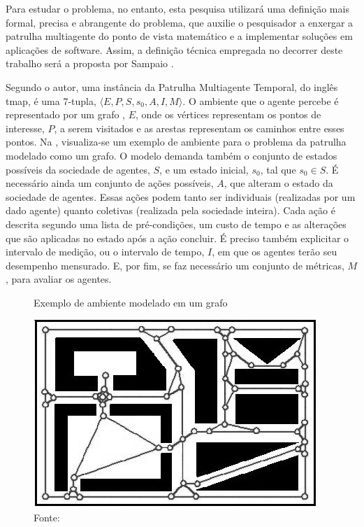 Para estudar o problema, no entanto, esta pesquisa utilizará uma definição mais 
formal, precisa e abrangente do problema, que auxilie o pesquisador a enxergar 
a patrulha multiagente do ponto de vista matemático e a implementar soluções em 
aplicações de software. Assim, a definição técnica empregada no decorrer deste 
trabalho será a proposta por Sampaio \citep{sampaiophd}.

Segundo o autor, uma instância da Patrulha Multiagente Temporal, do inglês 
\ac{tmap}, é uma 7-tupla, $ \langle E, P, S, s_{0}, A, I, M \rangle $. O 
ambiente que o agente percebe é representado por um grafo 
\citep{Rosen:2002:DMA:579402}, $E$, onde os vértices representam os pontos de 
interesse, $P$, a serem visitados e as arestas representam os caminhos entre 
esses pontos. Na , visualiza-se um exemplo de ambiente 
para o problema da patrulha modelado como um grafo. O modelo demanda também o 
conjunto de estados possíveis da sociedade de agentes, $S$, e um estado inicial, 
$ s_{0} $, tal que $ s_{0} \in S $. É necessário ainda um conjunto de ações 
possíveis, $A$, que alteram o estado da sociedade de agentes. Essas ações podem 
tanto ser individuais (realizadas por um dado agente) quanto coletivas 
(realizada pela sociedade inteira). Cada ação é descrita segundo uma lista de 
pré-condições, um custo de tempo e as alterações que são aplicadas no estado 
após a ação concluir. É preciso também explicitar o intervalo de medição, ou o 
intervalo de tempo, $I$, em que os agentes terão seu desempenho mensurado. E, 
por fim, se faz necessário um conjunto de métricas, $M$, para avaliar os 
agentes.

\begin{figure}[tp]
	\caption[Exemplo de ambiente modelado em um grafo]{Exemplo de ambiente 
		modelado em um grafo}
	\centering
	\includegraphics[width=0.75\columnwidth]{images/grafoExemplo.png}
	\caption*{Fonte: \citep{sampaiophd}}
	\label{fig:graphexample}
\end{figure}

